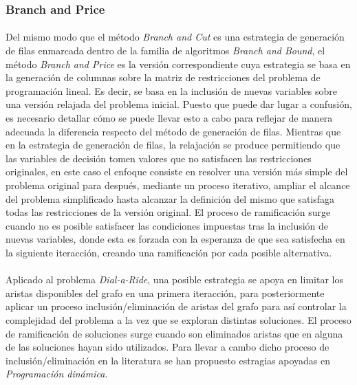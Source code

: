 \documentclass{subfiles}
\begin{document}
        \subsubsection{Branch and Price}
        \label{sec:solving_branch_price}

          \paragraph{}
          Del mismo modo que el método \emph{Branch and Cut} es una estrategia de generación de filas enmarcada dentro de la familia de algoritmos \emph{Branch and Bound}, el método \emph{Branch and Price} es la versión correspondiente cuya estrategia se basa en la generación de columnas sobre la matriz de restricciones del problema de programación lineal. Es decir, se basa en la inclusión de nuevas variables sobre una versión relajada del problema inicial. Puesto que puede dar lugar a confusión, es necesario detallar cómo se puede llevar esto a cabo para reflejar de manera adecuada la diferencia respecto del método de generación de filas. Mientras que en la estrategia de generación de filas, la relajación se produce permitiendo que las variables de decisión tomen valores que no satisfacen las restricciones originales, en este caso el enfoque consiste en resolver una versión más simple del problema original para después, mediante un proceso iterativo, ampliar el alcance del problema simplificado hasta alcanzar la definición del mismo que satisfaga todas las restricciones de la versión original. El proceso de ramificación surge cuando no es posible satisfacer las condiciones impuestas tras la inclusión de nuevas variables, donde esta es forzada con la esperanza de que sea satisfecha en la siguiente iteracción, creando una ramificación por cada posible alternativa.

          \paragraph{}
          Aplicado al problema \emph{Dial-a-Ride}, una posible estrategia se apoya en limitar los aristas disponibles del grafo en una primera iteracción, para posteriormente aplicar un proceso inclusión/eliminación de aristas del grafo para así controlar la complejidad del problema a la vez que se exploran distintas soluciones. El proceso de ramificación de soluciones surge cuando son eliminados aristas que en alguna de las soluciones hayan sido utilizados. Para llevar a cambo dicho proceso de inclusión/eliminación en la literatura se han propuesto estragias apoyadas en \emph{Programación dinámica}.
\end{document}

